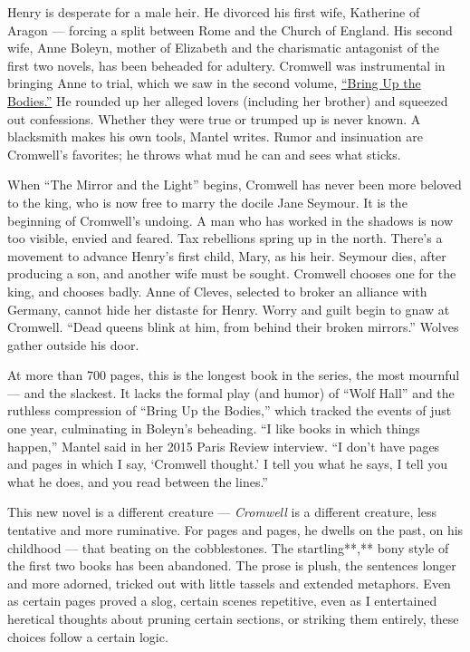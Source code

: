 Henry is desperate for a male heir. He divorced his first wife,
Katherine of Aragon --- forcing a split between Rome and the Church of
England. His second wife, Anne Boleyn, mother of Elizabeth and the
charismatic antagonist of the first two novels, has been beheaded for
adultery. Cromwell was instrumental in bringing Anne to trial, which we
saw in the second volume,
\href{https://www.nytimes3xbfgragh.onion/2012/05/27/books/review/bring-up-the-bodies-by-hilary-mantel.html}{``Bring
Up the Bodies.''} He rounded up her alleged lovers (including her
brother) and squeezed out confessions. Whether they were true or trumped
up is never known. A blacksmith makes his own tools, Mantel writes.
Rumor and insinuation are Cromwell's favorites; he throws what mud he
can and sees what sticks.

When ``The Mirror and the Light'' begins, Cromwell has never been more
beloved to the king, who is now free to marry the docile Jane Seymour.
It is the beginning of Cromwell's undoing. A man who has worked in the
shadows is now too visible, envied and feared. Tax rebellions spring up
in the north. There's a movement to advance Henry's first child, Mary,
as his heir. Seymour dies, after producing a son, and another wife must
be sought. Cromwell chooses one for the king, and chooses badly. Anne of
Cleves, selected to broker an alliance with Germany, cannot hide her
distaste for Henry. Worry and guilt begin to gnaw at Cromwell. ``Dead
queens blink at him, from behind their broken mirrors.'' Wolves gather
outside his door.

At more than 700 pages, this is the longest book in the series, the most
mournful --- and the slackest. It lacks the formal play (and humor) of
``Wolf Hall'' and the ruthless compression of ``Bring Up the Bodies,''
which tracked the events of just one year, culminating in Boleyn's
beheading. ``I like books in which things happen,'' Mantel said in her
2015 Paris Review interview. ``I don't have pages and pages in which I
say, `Cromwell thought.' I tell you what he says, I tell you what he
does, and you read between the lines.''

This new novel is a different creature --- \emph{Cromwell} is a
different creature, less tentative and more ruminative. For pages and
pages, he dwells on the past, on his childhood --- that beating on the
cobblestones. The startling**,** bony style of the first two books has
been abandoned. The prose is plush, the sentences longer and more
adorned, tricked out with little tassels and extended metaphors. Even as
certain pages proved a slog, certain scenes repetitive, even as I
entertained heretical thoughts about pruning certain sections, or
striking them entirely, these choices follow a certain logic.

